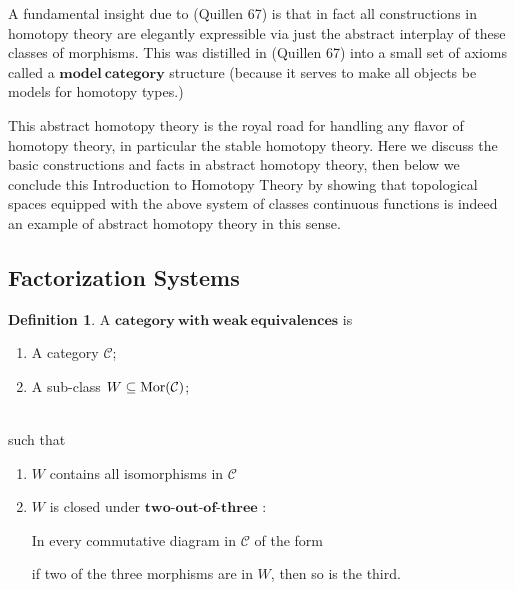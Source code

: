 \documentclass[a4paper]{article}
\theoremstyle{plain}
\theoremstyle{definition}
\newtheorem{defn}{Definition}[section]
\theoremstyle{remark}
\newcommand{\mc}[1]{\mathcal{#1}}
\newcommand{\mbf}[1]{\mathbf{#1}}
\newcommand{\mcC}{\mc C}
\DeclareMathOperator{\Mor}{\rm{Mor}}
\begin{document}
    \par A fundamental insight due to (Quillen 67) is that in fact
    all constructions in homotopy theory are elegantly expressible
    via just the abstract interplay of these classes of morphisms.
    This was distilled in (Quillen 67) into
    a small set of axioms called a $\mbf{model\ category}$ structure
    (because it serves to make all objects be models for homotopy types.)

    \par This abstract homotopy theory is the royal road for
    handling any flavor of homotopy theory,
    in particular the stable homotopy theory.
    Here we discuss the basic constructions and facts in abstract homotopy theory,
    then below we conclude this Introduction to Homotopy Theory by
    showing that topological spaces equipped with the above system of
    classes continuous functions is indeed an example of
    abstract homotopy theory in this sense.


    \subsection{Factorization Systems}

    \begin{defn}
        A $\mbf{category\ with\ weak\ equivalences}$ is
        \begin{enumerate}
            \item A category $\mcC$;
            \item A sub-class $W \subseteq \Mor(\mcC)$;
        \end{enumerate}
        \ \\
        such that
        \begin{enumerate}
            \item $W$ contains all isomorphisms in $\mcC$
            \item $W$ is closed under $\mbf{two\text{-}out\text{-} of\text{-} three}$ :
            \par In every commutative diagram in $\mcC$ of the form

            if two of the three morphisms are in $W$, then so is the third.

        \end{enumerate}

    \end{defn}
\end{document}
